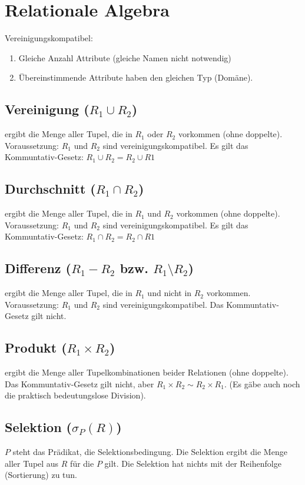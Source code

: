 \section{Relationale Algebra}
Vereinigungskompatibel:
\begin{enumerate}
	\item Gleiche Anzahl Attribute (gleiche Namen nicht notwendig)
	\item Übereinstimmende Attribute haben den gleichen Typ (Domäne).
\end{enumerate}

\subsection{Vereinigung ($R_1 \cup R_2$)}
ergibt die Menge aller Tupel, die in $R_1$ oder $R_2$ vorkommen (ohne doppelte). Voraussetzung: $R_1$ und $R_2$ sind vereinigungskompatibel.
Es gilt das Kommuntativ-Gesetz: $R_1 \cup R_2 = R_2 \cup R1$

\subsection{Durchschnitt ($R_1 \cap R_2$)}
ergibt die Menge aller Tupel, die in $R_1$ und $R_2$ vorkommen (ohne doppelte). Voraussetzung: $R_1$ und $R_2$ sind vereinigungskompatibel.
Es gilt das Kommuntativ-Gesetz: $R_1 \cap R_2 = R_2 \cap R1$

\subsection{Differenz ($R_1 - R_2$ bzw. $R_1 \setminus R_2$)}
ergibt die Menge aller Tupel, die in $R_1$ und nicht in $R_2$ vorkommen. Voraussetzung: $R_1$ und $R_2$ sind vereinigungskompatibel.
Das Kommuntativ-Gesetz gilt nicht.

\subsection{Produkt ($R_1 \times R_2$)}
ergibt die Menge aller Tupelkombinationen beider Relationen (ohne doppelte).
Das Kommuntativ-Gesetz gilt nicht, aber $R_1 \times R_2 \sim R_2 \times R_1$.
(Es gäbe auch noch die praktisch bedeutungslose Division).

\subsection{Selektion ($\sigma_P (R)$)}
$P$ steht das Prädikat, die Selektionsbedingung. Die Selektion ergibt die Menge aller Tupel aus $R$ für die $P$ gilt.
Die Selektion hat nichts mit der Reihenfolge (Sortierung) zu tun.

